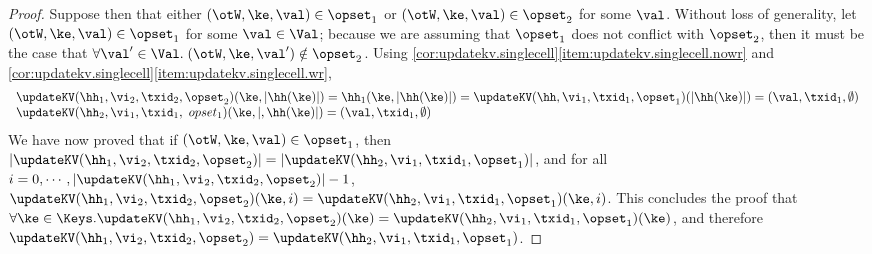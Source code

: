 \begin{proof}
Suppose then that  either $(\otW, \ke, \val) \in \opset_1$ or $(\otW,\ke, \val) \in \opset_2$ 
for some $\val$. Without loss of generality, let $(\otW,\ke,\val) \in \opset_1$ for some $\val \in \Val$; 
because we are assuming that $\opset_1$ does not conflict with $\opset_2$, then 
it must be the case that $\forall \val' \in \Val.\;(\otW,\ke,\val') \notin \opset_2$. 
Using \cref{cor:updatekv.singlecell}\eqref{item:updatekv.singlecell.nowr} and 
\cref{cor:updatekv.singlecell}\eqref{item:updatekv.singlecell.wr}, 
\[
\begin{array}{l}
\updateKV(\hh_1, \vi_2, \txid_2, \opset_2)(\ke, \lvert \hh(\ke) \rvert) = 
\hh_1(\ke, \lvert \hh(\ke) \rvert) = \updateKV(\hh, \vi_1, \txid_1, \opset_1)(\lvert \hh(\ke) \rvert) = (\val, \txid_1, \emptyset)\\
\updateKV(\hh_2, \vi_1, \txid_1,\ opset_1)(\ke, \lvert, \hh(\ke) \rvert) = (\val, \txid_1, \emptyset)
\end{array}
\]
We have now proved that if $(\otW,\ke,\val) \in \opset_1$, then $\lvert \updateKV(\hh_1, \vi_2, \txid_2, \opset_2) \rvert = 
\lvert \updateKV(\hh_2, \vi_1, \txid_1, \opset_1) \rvert$, and for all 
$i=0,\cdots, \lvert \updateKV(\hh_1, \vi_2, \txid_2, \opset_2) \rvert - 1$, 
$\updateKV(\hh_1,\vi_2, \txid_2, \opset_2)(\ke, i) = \updateKV(\hh_2, \vi_1, \txid_1, \opset_1)(\ke, i)$. 
This concludes the proof that $\forall \ke \in \Keys.\updateKV(\hh_1,\vi_2,\txid_2,\opset_2)(\ke) = 
\updateKV(\hh_2,\vi_1,\txid_1,\opset_1)(\ke)$, and therefore 
$\updateKV(\hh_1, \vi_2, \txid_2, \opset_2) = \updateKV(\hh_2, \vi_1,\txid_1,\opset_1)$.
\end{proof}
%
%
